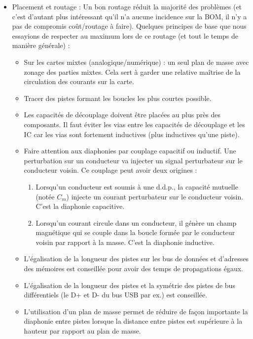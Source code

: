 \begin{itemize}
	\item Placement et routage :
	      Un bon routage réduit la majorité des problèmes (et c'est d’autant plus intéressant qu’il n’a aucune incidence sur la BOM, il n’y a pas de compromis coût/routage à faire). 
	      Quelques principes de base que nous essayions de respecter au maximum lors de ce routage (et tout le temps de manière générale) :
	      \begin{itemize}
	      	\item Sur les cartes mixtes (analogique/numérique) : un seul plan de masse avec zonage des parties mixtes.
	      	      Cela sert à garder une relative maîtrise de la circulation des courants sur la carte.
	      	\item Tracer des pistes formant les boucles les plus courtes possible.
	      	\item Les capacités de découplage doivent être placées au plus près des composants. 
	      	      Il faut éviter les vias entre les capacités de découplage et les IC car les vias sont fortement inductives (plus inductives qu’une piste).
	      	\item Faire attention aux diaphonies par couplage capacitif ou inductif. Une perturbation sur un conducteur va injecter un signal perturbateur sur le conducteur voisin. Ce couplage peut avoir deux origines :
	      	      \begin{enumerate}
	      	      	\item Lorsqu’un conducteur est soumis à une d.d.p., la capacité mutuelle (notée \(C_m\)) injecte un courant perturbateur sur le conducteur voisin. 
	      	      	      C’est la diaphonie capacitive.
	      	      	\item Lorsqu’un courant circule dans un conducteur, il génère un champ magnétique qui se couple dans la boucle formée par le conducteur voisin par rapport à la masse. 
	      	      	      C'est la diaphonie inductive.
	      	      \end{enumerate}
	      	\item L'égalisation de la longueur des pistes sur les bus de données et d'adresses des mémoires est conseillée pour avoir des temps de propagations égaux.
	      	\item L'égalisation de la longueur des pistes et la symétrie des pistes de bus différentiels (le D+ et D- du bus USB par ex.) est conseillée.
	      	\item L’utilisation d’un plan de masse permet de réduire de façon importante la diaphonie entre pistes lorsque la distance entre pistes est supérieure à la hauteur par rapport au plan de masse. 

\end{itemize}
\end{itemize}
